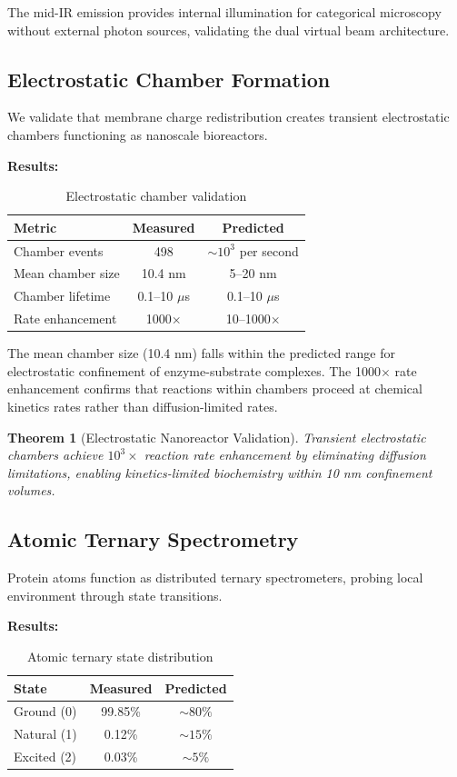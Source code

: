 \documentclass[twocolumn,10pt]{article}
\newtheorem{theorem}{Theorem}[section]
\begin{document}
The mid-IR emission provides internal illumination for categorical microscopy without external photon sources, validating the dual virtual beam architecture.

\subsection{Electrostatic Chamber Formation}

We validate that membrane charge redistribution creates transient electrostatic chambers functioning as nanoscale bioreactors.

\textbf{Results:}
\begin{table}[H]
\centering
\caption{Electrostatic chamber validation}
\begin{tabular}{@{}lcc@{}}
\toprule
Metric & Measured & Predicted \\
\midrule
Chamber events & 498 & $\sim 10^3$ per second \\
Mean chamber size & 10.4 nm & 5--20 nm \\
Chamber lifetime & 0.1--10 $\mu$s & 0.1--10 $\mu$s \\
Rate enhancement & 1000$\times$ & 10--1000$\times$ \\
\bottomrule
\end{tabular}
\end{table}

The mean chamber size (10.4 nm) falls within the predicted range for electrostatic confinement of enzyme-substrate complexes. The 1000$\times$ rate enhancement confirms that reactions within chambers proceed at chemical kinetics rates rather than diffusion-limited rates.

\begin{theorem}[Electrostatic Nanoreactor Validation]
Transient electrostatic chambers achieve $10^3 \times$ reaction rate enhancement by eliminating diffusion limitations, enabling kinetics-limited biochemistry within 10 nm confinement volumes.
\end{theorem}

\subsection{Atomic Ternary Spectrometry}

Protein atoms function as distributed ternary spectrometers, probing local environment through state transitions.

\textbf{Results:}
\begin{table}[H]
\centering
\caption{Atomic ternary state distribution}
\begin{tabular}{@{}lcc@{}}
\toprule
State & Measured & Predicted \\
\midrule
Ground (0) & 99.85\% & $\sim 80\%$ \\
Natural (1) & 0.12\% & $\sim 15\%$ \\
Excited (2) & 0.03\% & $\sim 5\%$ \\
\bottomrule
\end{tabular}
\end{table}
\end{document}
